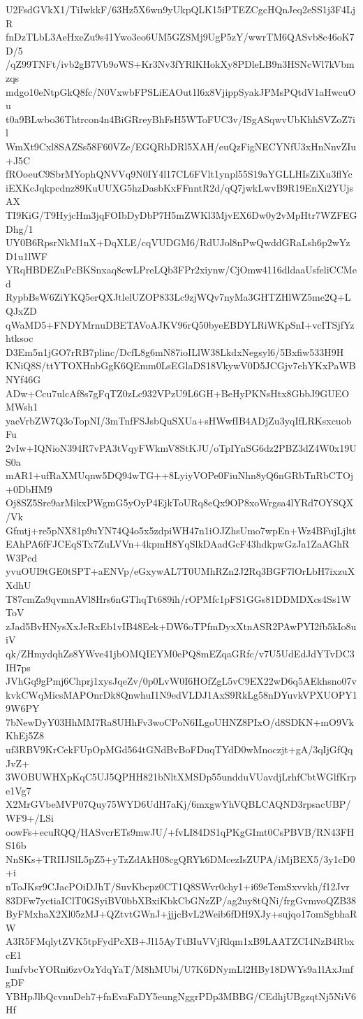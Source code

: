 U2FsdGVkX1/TiIwkkF/63Hz5X6wn9yUkpQLK15iPTEZCgcHQnJeq2eSS1j3F4LjR
fnDzTLbL3AeHxeZu9s41Ywo3eo6UM5GZSMj9UgP5zY/wwrTM6QASvb8c46oK7D/5
/qZ99TNFt/ivb2gB7Vb9oWS+Kr3Nv3fYRlKHokXy8PDleLB9n3HSNcWl7kVbmzqs
mdgo10eNtpGkQ8fc/N0VxwbFPSLiEAOut1l6x8VjippSyakJPMsPQtdV1aHwcuOu
t0a9BLwbo36Thtrcon4n4BiGRreyBhFsH5WToFUC3v/ISgASqwvUbKhhSVZoZ7il
WmXt9Cxl8SAZSs58F60VZe/EGQRbDRl5XAH/euQzFigNECYNfU3xHnNnvZIu+J5C
fROoeuC9SbrMYophQNVVq9N0IY4l17CL6FVlt1ynpl55S19aYGLLHIsZiXu3flYc
iEXKcJqkpcdnz89KuUUXG5hzDasbKxFFnntR2d/qQ7jwkLwvB9R19EnXi2YUjsAX
TI9KiG/T9HyjcHm3jqFOIbDyDbP7H5mZWKl3MjvEX6Dw0y2vMpHtr7WZFEGDhg/1
UY0B6RpsrNkM1nX+DqXLE/cqVUDGM6/RdUJol8nPwQwddGRaLsh6p2wYzD1u1lWF
YRqHBDEZuPcBKSnxaq8cwLPreLQb3FPr2xiynw/CjOmw4116dldaaUsfeliCCMed
RypbBsW6ZiYKQ5erQXJtlelUZOP833Lc9zjWQv7nyMa3GHTZHlWZ5me2Q+LQJxZD
qWaMD5+FNDYMrnuDBETAVoAJKV96rQ50byeEBDYLRiWKpSnI+vcITSjfYzhtksoc
D3Em5n1jGO7rRB7plinc/DcfL8g6mN87ioILlW38LkdxNegsyl6/5Bxfiw533H9H
KNiQ8S/ttYTOXHnbGgK6QEmm0LsEGlaDS18VkywV0D5JCGjv7ehYKxPaWBNYf46G
ADw+Ccu7ulcAf8s7gFqTZ0zLc932VPzU9L6GH+BeHyPKNsHtx8GbbJ9GUEOMWsh1
yaeVrbZW7Q3oTopNI/3mTnfFSJsbQuSXUa+sHWwfIB4ADjZu3yqIfLRKsxcuobFu
2vIw+IQNioN394R7vPA3tVqyFWkmV8StKJU/oTpIYnSG6dz2PBZ3dZ4W0x19US0a
mAR1+ufRaXMUqnw5DQ94wTG++8LyiyVOPe0FiuNhn8yQ6nGRbTnRbCTOj+0DbHM9
Oj8SZ5Sre9arMikxPWgmG5yOyP4EjkToURq8eQx9OP8xoWrgsa4lYRd7OYSQX/Vk
Gfmtj+re5pNX81p9uYN74Q4o5x5zdpiWH47n1iOJZhsUmo7wpEn+Wz4BFujLjltt
EAhPA6fFJCEqSTx7ZuLVVn+4kpmH8YqSlkDAadGcF43hdkpwGzJa1ZaAGhRW3Pcd
yvuOUI9tGE0tSPT+aENVp/eGxywAL7T0UMhRZn2J2Rq3BGF7lOrLbH7ixzuXXdhU
T87cmZa9qvmnAVl8Hrs6nGThqTt689ih/rOPMfc1pFS1GGs81DDMDXcs4Ss1WToV
zJad5BvHNysXxJeRxEb1vIB48Eek+DW6oTPfmDyxXtnASR2PAwPYI2fb5kIo8uiV
qk/ZHmydqhZs8YWve41jbOMQIEYM0ePQ8mEZqaGRfc/v7U5UdEdJdYTvDC3IH7ps
JVhGq9gPmj6Chprj1xysJqeZv/0p0LvW0I6HOfZgL5vC9EX22wD6q5AEkhsno07v
kvkCWqMicsMAPOnrDk8QnwhuI1N9edVLDJ1AxS9RkLg58nDYuvkVPXUOPY19W6PY
7bNewDyY03HhMM7Ra8UHhFv3woCPoN6ILgoUHNZ8PIxO/d8SDKN+mO9VkKhEj5Z8
uf3RBV9KrCekFUpOpMGd564tGNdBvBoFDuqTYdD0wMnoczjt+gA/3qIjGfQqJvZ+
3WOBUWHXpKqC5UJ5QPHH821bNltXMSDp55undduVUavdjLrhfCbtWGlfKrpe1Vg7
X2MrGVbeMVP07Quy75WYD6UdH7aKj/6mxgwYhVQBLCAQND3rpsacUBP/WF9+/LSi
oowFs+ecuRQQ/HASvcrETs9mwJU/+fvLI84DS1qPKgGImt0CsPBVB/RN43FHS16b
NnSKs+TRIIJSlL5pZ5+yTzZdAkH08cgQRYk6DMcezIsZUPA/iMjBEX5/3y1cD0+i
nToJKsr9CJacPOiDJhT/SuvKbcpz0CT1Q8SWvr0chy1+i69eTemSxvvkh/f12Jvr
83DFw7yctiaIClT0GSyiBV0bbXBxiKbkCbGNzZP/ag2uy8tQNi/frgGvmvoQZB38
ByFMxhaX2Xl05zMJ+QZtvtGWnJ+jjjcBvL2Weib6fDH9XJy+sujqo17omSgbhaRW
A3R5FMqlytZVK5tpFydPcXB+Jl15AyTtBIuVVjRlqm1xB9LAATZCI4NzB4RbxcE1
IunfvbcYORni6zvOzYdqYaT/M8hMUbi/U7K6DNymLl2HBy18DWYs9a1lAxJmfgDF
YBHpJlbQcvnuDeh7+fnEvaFaDY5eungNggrPDp3MBBG/CEdhjUBgzqtNj5NiV6Hf
